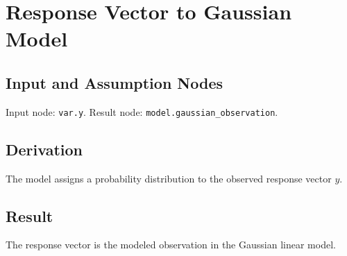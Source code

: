 \section{Response Vector to Gaussian Model}
\label{edge:y-to-gaussian-model}

\subsection{Input and Assumption Nodes}
Input node: \texttt{var.y}. Result node: \texttt{model.gaussian\_observation}.

\subsection{Derivation}
The model assigns a probability distribution to the observed response vector \(y\).

\subsection{Result}
The response vector is the modeled observation in the Gaussian linear model.

